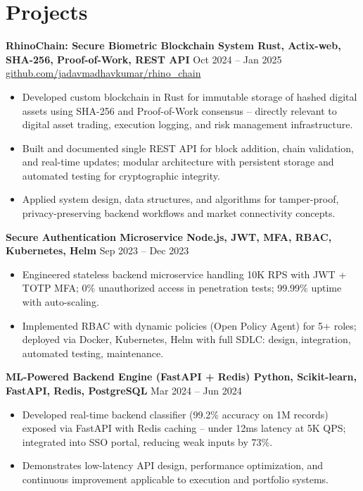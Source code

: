 \documentclass[9pt,letterpaper]{article}
\begin{document}
\section{Projects}
\textbf{RhinoChain: Secure Biometric Blockchain System \textbar{} Rust, Actix-web, SHA-256, Proof-of-Work, REST API} \hfill Oct 2024 -- Jan 2025\\
\href{https://github.com/jadavmadhavkumar/rhino_chain}{github.com/jadavmadhavkumar/rhino\_chain}
\begin{itemize}
\item Developed custom blockchain in Rust for immutable storage of hashed digital assets using SHA-256 and Proof-of-Work consensus -- directly relevant to digital asset trading, execution logging, and risk management infrastructure.
\item Built and documented single REST API for block addition, chain validation, and real-time updates; modular architecture with persistent storage and automated testing for cryptographic integrity.
\item Applied system design, data structures, and algorithms for tamper-proof, privacy-preserving backend workflows and market connectivity concepts.
\end{itemize}
\textbf{Secure Authentication Microservice \textbar{} Node.js, JWT, MFA, RBAC, Kubernetes, Helm} \hfill Sep 2023 -- Dec 2023
\begin{itemize}
\item Engineered stateless backend microservice handling 10K RPS with JWT + TOTP MFA; 0\% unauthorized access in penetration tests; 99.99\% uptime with auto-scaling.
\item Implemented RBAC with dynamic policies (Open Policy Agent) for 5+ roles; deployed via Docker, Kubernetes, Helm with full SDLC: design, integration, automated testing, maintenance.
\end{itemize}
\textbf{ML-Powered Backend Engine (FastAPI + Redis) \textbar{} Python, Scikit-learn, FastAPI, Redis, PostgreSQL} \hfill Mar 2024 -- Jun 2024
\begin{itemize}
\item Developed real-time backend classifier (99.2\% accuracy on 1M records) exposed via FastAPI with Redis caching -- under 12ms latency at 5K QPS; integrated into SSO portal, reducing weak inputs by 73\%.
\item Demonstrates low-latency API design, performance optimization, and continuous improvement applicable to execution and portfolio systems.
\end{itemize}
\end{document}
